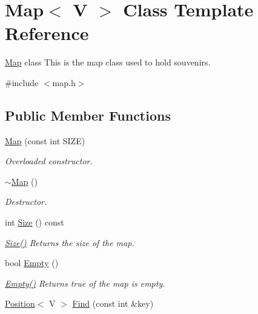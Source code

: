 \hypertarget{class_map}{}\section{Map$<$ V $>$ Class Template Reference}
\label{class_map}


\mbox{\hyperlink{class_map}{Map}} class This is the map class used to hold souvenirs.  




{\ttfamily \#include $<$map.\+h$>$}

\subsection*{Public Member Functions}
\begin{DoxyCompactItemize}
\item 
\mbox{\label{class_map_ab69b0a4611deb854aaa3a29bbdb831fd}} 
\mbox{\hyperlink{class_map_ab69b0a4611deb854aaa3a29bbdb831fd}{Map}} (const int S\+I\+ZE)
\begin{DoxyCompactList}\small\item\em Overloaded constructor. \end{DoxyCompactList}\item 
\mbox{\label{class_map_ab353b487c30315a03bd2761072a8773a}} 
\mbox{\hyperlink{class_map_ab353b487c30315a03bd2761072a8773a}{$\sim$\+Map}} ()
\begin{DoxyCompactList}\small\item\em Destructor. \end{DoxyCompactList}\item 
int \mbox{\hyperlink{class_map_a0086c1ab7748d1517aaf8618043dd7f3}{Size}} () const
\begin{DoxyCompactList}\small\item\em \mbox{\hyperlink{class_map_a0086c1ab7748d1517aaf8618043dd7f3}{Size()}} Returns the size of the map. \end{DoxyCompactList}\item 
bool \mbox{\hyperlink{class_map_a842c78e12564c5d4248efddf0a0dd218}{Empty}} ()
\begin{DoxyCompactList}\small\item\em \mbox{\hyperlink{class_map_a842c78e12564c5d4248efddf0a0dd218}{Empty()}} Returns true of the map is empty. \end{DoxyCompactList}\item 
\mbox{\hyperlink{class_position}{Position}}$<$ V $>$ \mbox{\hyperlink{class_map_a5a4498cca2ab6536d04915f07ca5f01f}{Find}} (const int \&key)

\end{DoxyCompactItemize}

